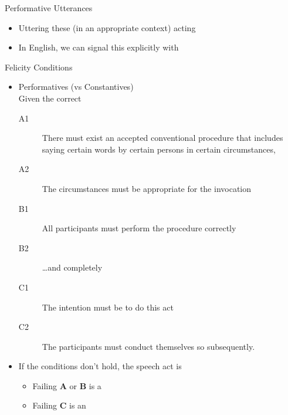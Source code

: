 \documentclass{beamer}
\begin{document}
\begin{frame}{Performative Utterances}

\begin{exe}
  \ex {}
  \ex {}
  \ex {} 
  \ex {}
  \ex {}
\end{exe}

\begin{itemize}
\item Uttering these (in an appropriate context)  acting
\\  
\item In English, we can signal this explicitly with 
\end{itemize}

\end{frame}

\begin{frame}{Felicity Conditions}
\begin{itemize}
\item Performatives (vs Constantives) 
\\ Given the correct 
  \begin{description}
  \item[A1] There must exist an accepted conventional procedure that
    includes saying certain words by certain persons in certain
    circumstances,
  \item[A2] The circumstances must be appropriate for the invocation
  \item[B1] All participants must perform the procedure correctly
  \item[B2] \ldots  and completely
  \item[C1] The intention must be to do this act
  \item[C2] The participants must conduct themselves so subsequently.
  \end{description}
\item If the conditions don't hold, the speech act is 
  \begin{itemize}
  \item Failing \textbf{A} or \textbf{B} is a 
  \item Failing \textbf{C} is an 
  \end{itemize}
  \end{itemize}

\end{frame}
\end{document}
